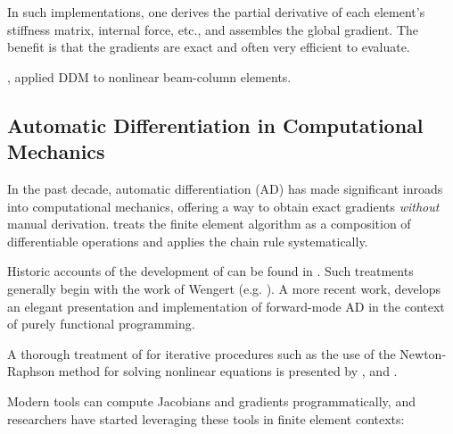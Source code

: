 In such implementations, one derives the partial derivative of each
element's stiffness matrix, internal force, etc., and assembles the
global gradient. 
The benefit is that the gradients are exact and often very efficient to evaluate. 

\cite{scott2004response}, 
applied DDM to nonlinear beam-column elements.

\cite{al-aukaily2017response}




\subsection{Automatic Differentiation in Computational Mechanics}

In the past decade, automatic differentiation (AD) has made
significant inroads into computational mechanics, offering a way to
obtain exact gradients \emph{without} manual derivation. 
\Autodiff{} treats the finite element
algorithm as a composition of differentiable operations and applies the
chain rule systematically. 

Historic accounts of the development
of \autodiff{} can be found in \textcite{iri2009automatic}. 
%
Such treatments generally begin with the work of Wengert (e.g. \textcite{wengert1964simple}). 
A more recent work,
\textcite{elliott2009beautiful} develops an elegant presentation and
implementation of forward-mode AD in the context of purely functional
programming.

A thorough treatment of \autodiff{} for iterative procedures such as the use of
the Newton-Raphson method for solving nonlinear equations is presented
by \textcite{beck1994automatic}, \textcite{gilbert1992automatic} and
\textcite{griewank1993derivative}. 

Modern \autodiff{} tools can compute Jacobians and
gradients programmatically, and researchers have started
leveraging these tools in finite element contexts:

